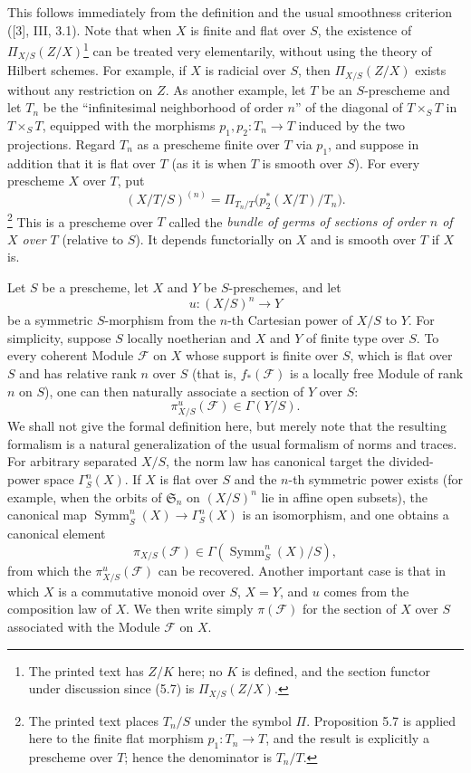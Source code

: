 This follows immediately from the definition and the usual smoothness
criterion ([3], III, 3.1). Note that when $X$ is finite and flat over $S$, the
existence of $\Pi_{X/S}(Z/X)$\footnote{The printed text has $Z/K$ here; no $K$
is defined, and the section functor under discussion since (5.7) is
$\Pi_{X/S}(Z/X)$.} can be treated very elementarily, without
using the theory of Hilbert schemes. For example, if $X$ is radicial over $S$,
then $\Pi_{X/S}(Z/X)$ exists without any restriction on $Z$. As another
example, let $T$ be an $S$-prescheme and let $T_n$ be the “infinitesimal
neighborhood of order $n$” of the diagonal of $T\times_ST$ in $T\times_ST$,
equipped with the morphisms $p_1,p_2:T_n\longrightarrow T$ induced by the two
projections. Regard $T_n$ as a prescheme finite over $T$ via $p_1$, and suppose
in addition that it is flat over $T$ (as it is when $T$ is smooth over $S$).
For every prescheme $X$ over $T$, put
\[
(X/T/S)^{(n)}=
\Pi_{T_n/T}\bigl(p_2^*(X/T)/T_n\bigr).
\]
\footnote{The printed text places $T_n/S$ under the symbol $\Pi$. Proposition
5.7 is applied here to the finite flat morphism $p_1:T_n\to T$, and the result
is explicitly a prescheme over $T$; hence the denominator is $T_n/T$.}
This is a prescheme over $T$ called the \emph{bundle of germs of sections of
order $n$ of $X$ over $T$} (relative to $S$). It depends functorially on $X$
and is smooth over $T$ if $X$ is.


Let $S$ be a prescheme, let $X$ and $Y$ be $S$-preschemes, and let
\[
u:(X/S)^n\longrightarrow Y
\]
be a symmetric $S$-morphism from the $n$-th Cartesian power of $X/S$ to $Y$.
For simplicity, suppose $S$ locally noetherian and $X$ and $Y$ of finite type
over $S$. To every coherent Module $\mathcal F$ on $X$ whose support is finite
over $S$, which is flat over $S$ and has relative rank $n$ over $S$ (that is,
$f_*(\mathcal F)$ is a locally free Module of rank $n$ on $S$), one can then
naturally associate a section of $Y$ over $S$:
\[
\pi^u_{X/S}(\mathcal F)\in\Gamma(Y/S).
\]
We shall not give the formal definition here, but merely note that the resulting
formalism is a natural generalization of the usual formalism of norms and
traces. For arbitrary separated $X/S$, the norm law has canonical target the divided-power space $\Gamma^n_S(X)$. If $X$ is flat over $S$ and the $n$-th symmetric power exists (for example, when the orbits of $\mathfrak S_n$ on $(X/S)^n$ lie in affine open subsets), the canonical map $\operatorname{Symm}^n_S(X)\to\Gamma^n_S(X)$ is an isomorphism, and one obtains a canonical element
\[
\pi_{X/S}(\mathcal F)\in\Gamma(\operatorname{Symm}^n_S(X)/S),
\]
from which the $\pi^u_{X/S}(\mathcal F)$ can be recovered. Another important
case is that in which $X$ is a commutative monoid over $S$, $X=Y$, and $u$
comes from the composition law of $X$. We then write simply $\pi(\mathcal F)$
for the section of $X$ over $S$ associated with the Module $\mathcal F$ on
$X$.

